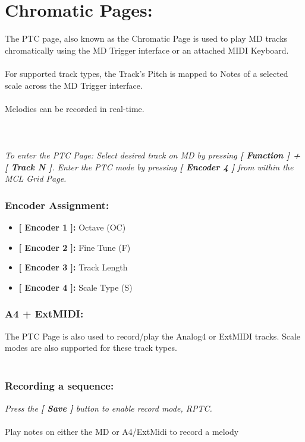 \chapter{Chromatic Pages:}
The PTC page, also known as the  Chromatic Page is used to play MD tracks chromatically using the MD Trigger interface or an attached MIDI Keyboard.\\
\\For supported track types, the Track’s Pitch is mapped to Notes of a selected scale across the MD Trigger interface.\\
\\Melodies can be recorded in real-time.\\
\\
\\\\
\textit{To enter the PTC Page: Select desired track on MD by pressing \textbf{[ Function ] + [ Track N ]}. Enter the PTC mode by pressing \textbf{[ Encoder 4 ] }from within the MCL Grid Page.}
\subsection{Encoder Assignment:}

	\begin{itemize}
		\item \textbf{[ Encoder 1 ]: } Octave (OC)
		\item \textbf{[ Encoder 2 ]: } Fine Tune (F)
		\item \textbf{[ Encoder 3 ]: } Track Length
		\item \textbf{[ Encoder 4 ]: } Scale Type (S)
	\end{itemize}
\subsection{A4 + ExtMIDI:}
The PTC Page is also used to record/play the Analog4 or ExtMIDI tracks. Scale modes are also supported for these track types.\\
\\
\subsection{Recording a sequence:}
\textit{Press the \textbf{[ Save ] }button to enable record mode, RPTC.\\}
\\Play notes on either the MD or A4/ExtMidi to record a melody
